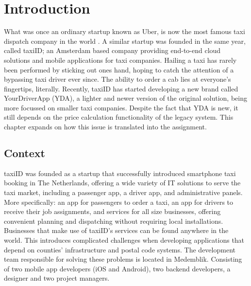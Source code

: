 \graphicspath{{Chapter1/Figs/Vector/}{Chapter1/Figs/}}

%
\chapter{Introduction}
What was once an ordinary startup known as Uber, is now the most famous taxi dispatch company in the world \cite{Uber}. A similar startup was founded in the same year, called taxiID; an Amsterdam based company providing end-to-end cloud solutions and mobile applications for taxi companies. Hailing a taxi has rarely been performed by sticking out ones hand, hoping to catch the attention of a bypassing taxi driver ever since. The ability to order a cab lies at everyone's fingertips, literally. Recently, taxiID has started developing a new brand called YourDriverApp (YDA), a lighter and newer version of the original solution, being more focussed on smaller taxi companies. Despite the fact that YDA is new, it still depends on the price calculation functionality of the legacy system. This chapter expands on how this issue is translated into the assignment.

%
\section{Context}
taxiID was founded as a startup that successfully introduced smartphone taxi booking in The Netherlands, offering a wide variety of IT solutions to serve the taxi market, including a passenger app, a driver app, and administrative panels. More specifically: an app for passengers to order a taxi, an app for drivers to receive their job assignments, and services for all size businesses, offering convenient planning and dispatching without requiring local installations. Businesses that make use of taxiID's services can be found anywhere in the world. This introduces complicated challenges when developing applications that depend on counties' infrastructure and postal code systems. The development team responsible for solving these problems is located in Medemblik. Consisting of two mobile app developers (iOS and Android), two backend developers, a designer and two project managers.

